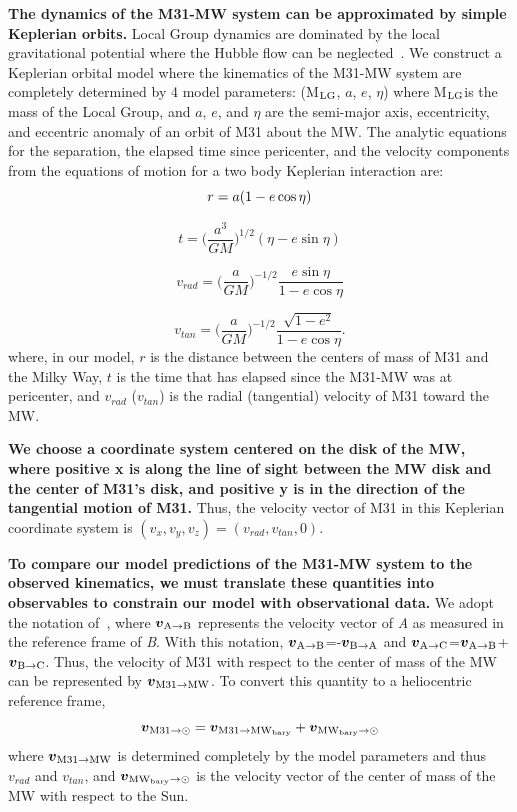 \documentclass[twocolumn]{aastex631}
\newcommand{\mlg}{M$_{\rm LG}$}
\newcommand{\bov}{\boldsymbol{v}}
\newcommand{\vel}[2]{\bov_{\rm #1 \to #2}}
\newcommand{\mwbary}{\rm MW_{bary}}
\begin{document}
\textbf{The dynamics of the M31-MW system can be approximated by simple Keplerian orbits.}
Local Group dynamics are dominated by the local gravitational potential where the Hubble flow can be neglected~\cite{}. We construct a Keplerian orbital model where the kinematics of the M31-MW system are completely determined by 4 model parameters: (\mlg, $a$, $e$, $\eta$) where \mlg is the mass of the Local Group, and $a$, $e$, and $\eta$ are the semi-major axis, eccentricity, and eccentric anomaly of an orbit of M31 about the MW. The analytic equations for the separation, the elapsed time since pericenter, and the velocity components from the equations of motion for a two body Keplerian interaction are:
\begin{equation}\label{eq:r}
  r = a(1-e\cos\eta)\\
\end{equation}

\begin{equation}\label{eq:t}
  t=\bigg(\frac{a^3}{GM}\bigg)^{1/2}(\eta-e\sin\eta)
\end{equation}

\begin{equation}\label{eq:vrad}
  v_{rad} = \bigg( \frac{a}{GM} \bigg)^{-1/2} \frac{e\sin\eta}{1-e\cos\eta}
\end{equation}

\begin{equation}\label{eq:vtan}
  v_{tan}= \bigg( \frac{a}{GM} \bigg)^{-1/2} \frac{\sqrt{1-e^2}}{1-e\cos\eta}.
\end{equation}
where, in our model, $r$ is the distance between the centers of mass of M31 and the Milky Way, $t$ is the time that has elapsed since the M31-MW was at pericenter, and $v_{rad}$ ($v_{tan}$) is the radial (tangential) velocity of M31 toward the MW. 

\textbf{We choose a coordinate system centered on the disk of the MW, where positive x is along the line of sight between the MW disk and the center of M31's disk, and positive y is in the direction of the tangential motion of M31.} Thus, the velocity vector of M31 in this Keplerian coordinate system is $(v_x, v_y, v_z) =(v_{rad},v_{tan},0)$. 

\textbf{To compare our model predictions of the M31-MW system to the observed kinematics, we must translate these quantities into observables to constrain our model with observational data.}
We adopt the notation of~\cite{Penarrubia2016}, where $\vel{A}{B}$ represents the velocity vector of \textit{A} as measured in the reference frame of \textit{B}. With this notation, $\vel{A}{B}$=-$\vel{B}{A}$ and $\vel{A}{C}$=$\vel{A}{B}$+$\vel{B}{C}$. Thus, the velocity of M31 with respect to the center of mass of the MW can be represented by $\vel{M31}{MW}$. To convert this quantity to a heliocentric reference frame, 
\begin{equation}  
  \vel{M31}{\odot} = \vel{M31}{\mwbary}+\vel{\mwbary}{\odot}
\end{equation}
where $\vel{M31}{MW}$ is determined completely by the model parameters and thus $v_{rad}$ and $v_{tan}$, and 
$\vel{\mwbary}{\odot}$ is the velocity vector of the center of mass of the MW with respect to the Sun. 
\end{document}
